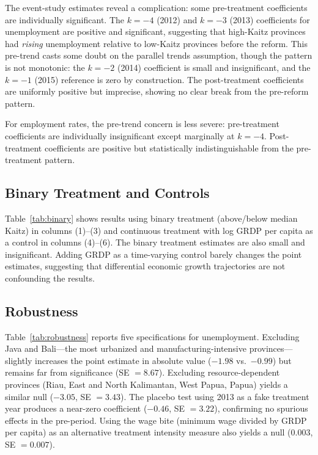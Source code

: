 \documentclass[12pt]{article}
\begin{document}
The event-study estimates reveal a complication: some pre-treatment coefficients are individually significant. The $k = -4$ (2012) and $k = -3$ (2013) coefficients for unemployment are positive and significant, suggesting that high-Kaitz provinces had \textit{rising} unemployment relative to low-Kaitz provinces before the reform. This pre-trend casts some doubt on the parallel trends assumption, though the pattern is not monotonic: the $k = -2$ (2014) coefficient is small and insignificant, and the $k = -1$ (2015) reference is zero by construction. The post-treatment coefficients are uniformly positive but imprecise, showing no clear break from the pre-reform pattern.

For employment rates, the pre-trend concern is less severe: pre-treatment coefficients are individually insignificant except marginally at $k = -4$. Post-treatment coefficients are positive but statistically indistinguishable from the pre-treatment pattern.

\subsection{Binary Treatment and Controls}

Table~\ref{tab:binary} shows results using binary treatment (above/below median Kaitz) in columns (1)--(3) and continuous treatment with log GRDP per capita as a control in columns (4)--(6). The binary treatment estimates are also small and insignificant. Adding GRDP as a time-varying control barely changes the point estimates, suggesting that differential economic growth trajectories are not confounding the results.



\subsection{Robustness}

Table~\ref{tab:robustness} reports five specifications for unemployment. Excluding Java and Bali---the most urbanized and manufacturing-intensive provinces---slightly increases the point estimate in absolute value ($-1.98$ vs.\ $-0.99$) but remains far from significance (SE $= 8.67$). Excluding resource-dependent provinces (Riau, East and North Kalimantan, West Papua, Papua) yields a similar null ($-3.05$, SE $= 3.43$). The placebo test using 2013 as a fake treatment year produces a near-zero coefficient ($-0.46$, SE $= 3.22$), confirming no spurious effects in the pre-period. Using the wage bite (minimum wage divided by GRDP per capita) as an alternative treatment intensity measure also yields a null ($0.003$, SE $= 0.007$).
\end{document}
